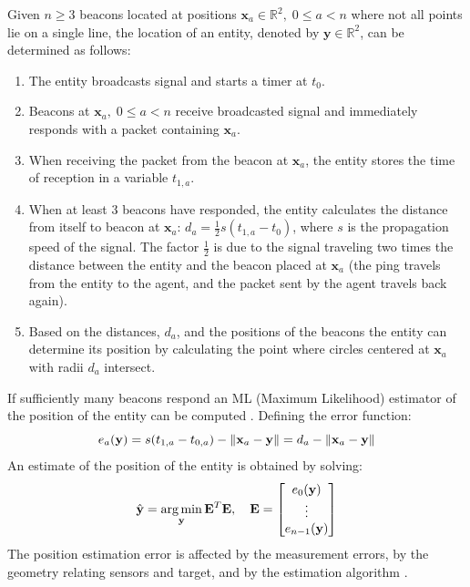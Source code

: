 Given $n\geq 3$ beacons located at positions $\mathbf{x}_{a}\in\mathbb{R}^{2},\; 0\leq a<n$ where not all points
lie on a single line, the location 
of an entity, denoted by $\mathbf{y}\in\mathbb{R}^{2}$, can be determined as follows:
\begin{enumerate}
  \item The entity broadcasts signal and starts a timer at $t_{0}$.
  \item Beacons at $\mathbf{x}_{a},\; 0\leq a<n$ receive broadcasted signal and immediately responds with a packet containing $\mathbf{x}_{a}$.
  \item When receiving the packet from the beacon at $\mathbf{x}_{a}$, the entity stores the time of reception in a variable $t_{1, a}$.
  \item When at least 3 beacons have responded, the entity calculates the distance
  from itself to beacon at $\mathbf{x}_{a}$: $d_{a} = \frac{1}{2}s(t_{1, a} - t_{0})$, where $s$ is the propagation speed of the signal. The factor $\frac{1}{2}$ is due to the signal traveling
  two times the distance between the entity and the beacon placed at $\mathbf{x}_{a}$ (the ping travels from the entity to the agent, and the packet
  sent by the agent travels back again).
  \item Based on the distances, $d_{a}$, and the positions of the beacons the entity can
  determine its position by calculating the point where circles centered at $\mathbf{x}_{a}$ with radii $d_{a}$ intersect.
\end{enumerate}
If sufficiently many beacons respond an ML (Maximum Likelihood) estimator of the position of the entity can be computed \cite{10.1145/381677.381693}.
Defining the error function:\begin{equation}
  e_{a}(\mathbf{y}) = s(t_{1, a} - t_{0, a}) - \left\lVert\mathbf{x}_{a} - \mathbf{y}\right\rVert = d_{a} - \left\lVert\mathbf{x}_{a} - \mathbf{y}\right\rVert
\end{equation}
An estimate of the position of the entity is obtained by solving:
\begin{equation}
  \hat{\mathbf{y}} = \operatorname*{arg\,min}_{\mathbf{y}} \mathbf{E}^{T}\mathbf{E},\quad\mathbf{E} = \begin{bmatrix}
    e_{0}(\mathbf{y})\\
    \vdots\\
    e_{n-1}(\mathbf{y})
  \end{bmatrix}
\end{equation}
The position estimation error is affected by the measurement errors, by the geometry relating sensors and target, and by the estimation algorithm \cite{trilat_error}.

